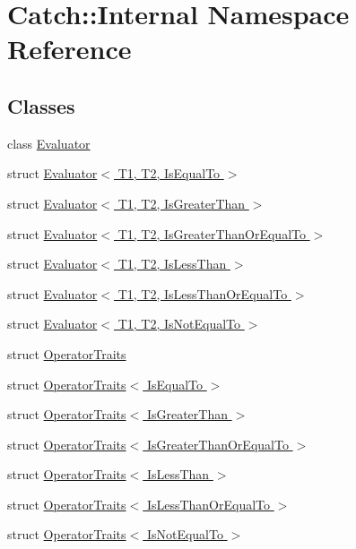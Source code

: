 \hypertarget{namespace_catch_1_1_internal}{}\section{Catch\+:\+:Internal Namespace Reference}
\label{namespace_catch_1_1_internal}
\subsection*{Classes}
\begin{DoxyCompactItemize}
\item 
class \hyperlink{class_catch_1_1_internal_1_1_evaluator}{Evaluator}
\item 
struct \hyperlink{struct_catch_1_1_internal_1_1_evaluator_3_01_t1_00_01_t2_00_01_is_equal_to_01_4}{Evaluator$<$ T1, T2, Is\+Equal\+To $>$}
\item 
struct \hyperlink{struct_catch_1_1_internal_1_1_evaluator_3_01_t1_00_01_t2_00_01_is_greater_than_01_4}{Evaluator$<$ T1, T2, Is\+Greater\+Than $>$}
\item 
struct \hyperlink{struct_catch_1_1_internal_1_1_evaluator_3_01_t1_00_01_t2_00_01_is_greater_than_or_equal_to_01_4}{Evaluator$<$ T1, T2, Is\+Greater\+Than\+Or\+Equal\+To $>$}
\item 
struct \hyperlink{struct_catch_1_1_internal_1_1_evaluator_3_01_t1_00_01_t2_00_01_is_less_than_01_4}{Evaluator$<$ T1, T2, Is\+Less\+Than $>$}
\item 
struct \hyperlink{struct_catch_1_1_internal_1_1_evaluator_3_01_t1_00_01_t2_00_01_is_less_than_or_equal_to_01_4}{Evaluator$<$ T1, T2, Is\+Less\+Than\+Or\+Equal\+To $>$}
\item 
struct \hyperlink{struct_catch_1_1_internal_1_1_evaluator_3_01_t1_00_01_t2_00_01_is_not_equal_to_01_4}{Evaluator$<$ T1, T2, Is\+Not\+Equal\+To $>$}
\item 
struct \hyperlink{struct_catch_1_1_internal_1_1_operator_traits}{Operator\+Traits}
\item 
struct \hyperlink{struct_catch_1_1_internal_1_1_operator_traits_3_01_is_equal_to_01_4}{Operator\+Traits$<$ Is\+Equal\+To $>$}
\item 
struct \hyperlink{struct_catch_1_1_internal_1_1_operator_traits_3_01_is_greater_than_01_4}{Operator\+Traits$<$ Is\+Greater\+Than $>$}
\item 
struct \hyperlink{struct_catch_1_1_internal_1_1_operator_traits_3_01_is_greater_than_or_equal_to_01_4}{Operator\+Traits$<$ Is\+Greater\+Than\+Or\+Equal\+To $>$}
\item 
struct \hyperlink{struct_catch_1_1_internal_1_1_operator_traits_3_01_is_less_than_01_4}{Operator\+Traits$<$ Is\+Less\+Than $>$}
\item 
struct \hyperlink{struct_catch_1_1_internal_1_1_operator_traits_3_01_is_less_than_or_equal_to_01_4}{Operator\+Traits$<$ Is\+Less\+Than\+Or\+Equal\+To $>$}
\item 
struct \hyperlink{struct_catch_1_1_internal_1_1_operator_traits_3_01_is_not_equal_to_01_4}{Operator\+Traits$<$ Is\+Not\+Equal\+To $>$}
\end{DoxyCompactItemize}
